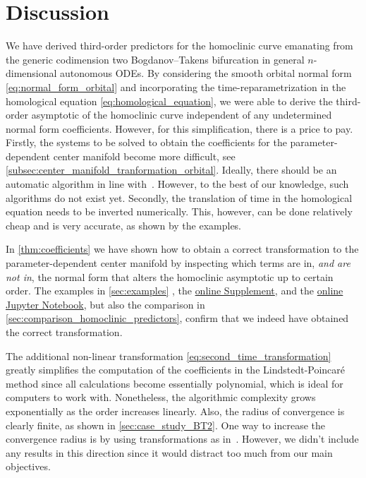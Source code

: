 \section{Discussion}%
We have derived third-order predictors for the homoclinic curve emanating from
the generic codimension two Bogdanov--Takens bifurcation in general
$n$-dimensional autonomous ODEs. By considering the smooth orbital normal form
\cref{eq:normal_form_orbital} and incorporating the time-re\-pa\-ram\-e\-triza\-tion in the
homological equation \cref{eq:homological_equation}, we were able to derive
the third-order asymptotic of the homoclinic curve independent of any undetermined
normal form coefficients. However, for this simplification, there is a price to
pay. Firstly, the systems to be solved to obtain the coefficients for the
parameter-dependent center manifold become more difficult, see
\cref{subsec:center_manifold_tranformation_orbital}. Ideally, there should be
an automatic algorithm in line with~\cite{Murdock@2003}. However, to the best
of our knowledge, such algorithms do not exist yet.  Secondly, the translation
of time in the homological equation needs to be inverted numerically. This,
however, can be done relatively cheap and is very accurate, as shown by the
examples.

In \cref{thm:coefficients} we have shown how to obtain a correct transformation
to the parameter-dependent center manifold by inspecting which terms are in,
\emph{and are not in}, the normal form that alters the homoclinic asymptotic up
to certain order. The examples in \cref{sec:examples}%
\unless\ifthesis%
, the \hyperref[mysupplement]{online Supplement},
\fi
and the
\href{https://mmbosschaert.github.io/MatCont7p2NewInitBTHom-/}{online Jupyter
Notebook}, but also the comparison in
\cref{sec:comparison_homoclinic_predictors}, confirm that we indeed have
obtained the correct transformation.

The additional non-linear transformation
\cref{eq:second_time_transformation} greatly simplifies the computation
of the coefficients in the Lindstedt-Poincar\'e method since all calculations
become essentially polynomial, which is ideal for computers to work with.
Nonetheless, the algorithmic complexity grows exponentially as the order
increases linearly. Also, the radius of convergence is clearly finite, as shown
in \cref{sec:case_study_BT2}. One way to increase the convergence radius is by
using transformations as in~\cite{Milton@1974}. However, we didn't include any
results in this direction since it would distract too much from our main
objectives.

